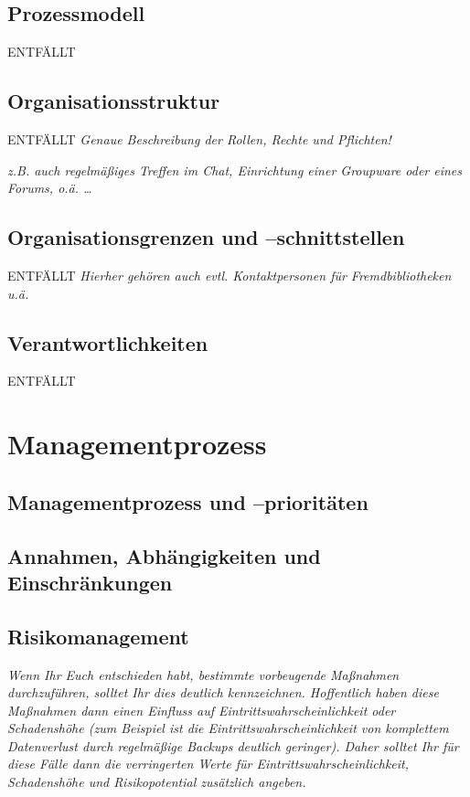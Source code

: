 \documentclass[fontsize=12pt,paper=a4,twoside]{scrartcl}
\begin{document}
\subsection{Prozessmodell}
ENTFÄLLT
\subsection{Organisationsstruktur}
ENTFÄLLT
{\em Genaue Beschreibung der Rollen, Rechte und Pflichten!}

{\em z.B. auch regelmäßiges Treffen im Chat, Einrichtung einer
  Groupware oder eines Forums, o.ä. \dots}

\subsection{Organisationsgrenzen und --schnittstellen}
ENTFÄLLT
{\em Hierher gehören auch evtl. Kontaktpersonen für Fremdbibliotheken u.ä.}

\subsection{Verantwortlichkeiten}
ENTFÄLLT
\section{Managementprozess}

\subsection{Managementprozess und --prioritäten}

\subsection{Annahmen, Abhängigkeiten und Einschränkungen}

\subsection{Risikomanagement}\label{riskmanagement}

{\em Wenn Ihr Euch entschieden habt, bestimmte vorbeugende Maßnahmen 
     durchzuführen, solltet Ihr dies deutlich kennzeichnen. Hoffentlich
     haben diese Maßnahmen dann einen Einfluss auf Eintrittswahrscheinlichkeit oder Schadenshöhe (zum Beispiel
     ist die Eintrittswahrscheinlichkeit von komplettem Datenverlust durch regelmäßige Backups deutlich 
     geringer). Daher solltet Ihr für diese Fälle dann die verringerten Werte für Eintrittswahrscheinlichkeit, 
     Schadenshöhe und Risikopotential zusätzlich angeben. }
\end{document}
